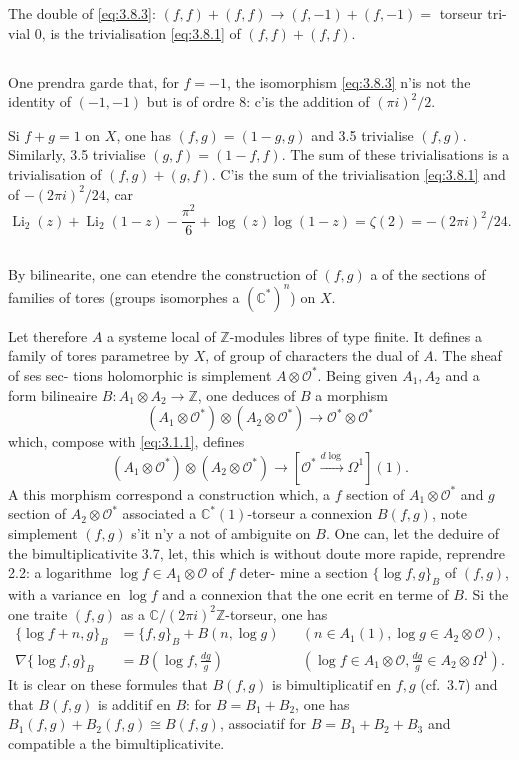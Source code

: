 \documentclass[12pt,a4paper]{article}
\theoremstyle{plain}
\theoremstyle{definition}
\theoremstyle{remark}
\newcommand{\cO}{\mathcal{O}}
\newcommand{\Z}{\mathbb{Z}}
\newcommand{\C}{\mathbb{C}}
\providecommand{\cO}{\mathcal{O}}
\begin{document}
The double of \eqref{eq:3.8.3}: $(f,f) + (f,f) \to (f,-1) + (f,-1) = {}$ torseur tri-
vial $0$, is the trivialisation \eqref{eq:3.8.1} of $(f,f) + (f,f)$.

\subsection{}

One prendra garde that, for $f = -1$, the isomorphism \eqref{eq:3.8.3} n'is not
the identity of $(-1, -1)$ but is of ordre $8$: c'is the addition of $(\pi i)^2/2$.

Si $f + g = 1$ on $X$, one has $(f,g) = (1-g, g)$ and 3.5 trivialise $(f,g)$. Similarly,
3.5 trivialise $(g,f) = (1-f, f)$. The sum of these trivialisations is a trivialisation
of $(f,g) + (g,f)$. C'is the sum of the trivialisation \eqref{eq:3.8.1} and of $-(2\pi i)^2/24$, car
\[
\operatorname{Li}_2(z) + \operatorname{Li}_2(1-z) - \frac{\pi^2}{6} + \log(z) \log(1-z) = \zeta(2) = -(2\pi i)^2/24.
\]

\subsection{}

By bilinearite, one can etendre the construction of $(f,g)$ a of the sections of
families of tores (groups isomorphes a $(\C^*)^n$) on $X$.

Let therefore $A$ a systeme local of $\Z$-modules libres of type finite. It defines a family
of tores parametree by $X$, of group of characters the dual of $A$. The sheaf of ses sec-
tions holomorphic is simplement $A \otimes \cO^*$. Being given $A_1, A_2$ and a form bilineaire
$B : A_1 \otimes A_2 \to \Z$, one deduces of $B$ a morphism
\[
(A_1 \otimes \cO^*) \otimes (A_2 \otimes \cO^*) \to \cO^* \otimes \cO^*
\]
which, compose with \eqref{eq:3.1.1}, defines
\[
(A_1 \otimes \cO^*) \otimes (A_2 \otimes \cO^*) \to [\cO^* \xrightarrow{d\log} \Omega^1](1).
\]
A this morphism correspond a construction which, a $f$ section of $A_1 \otimes \cO^*$ and $g$ section
of $A_2 \otimes \cO^*$ associated a $\C^*(1)$-torseur a connexion $B(f,g)$, note simplement $(f,g)$ s'it
n'y a not of ambiguite on $B$. One can, let the deduire of the bimultiplicativite 3.7, let,
this which is without doute more rapide, reprendre 2.2: a logarithme $\log f \in A_1 \otimes \cO$ of $f$ deter-
mine a section $\{\log f, g\}_B$ of $(f,g)$, with a variance en $\log f$ and a connexion that
the one ecrit en terme of $B$. Si the one traite $(f,g)$ as a $\C/(2\pi i)^2\Z$-torseur, one has
\begin{align}
\{\log f + n, g\}_B &= \{f,g\}_B + B(n, \log g) && (n \in A_1(1), \log g \in A_2 \otimes \cO), \label{eq:3.10.1} \\
\nabla\{\log f, g\}_B &= B(\log f, \frac{dg}{g}) && (\log f \in A_1 \otimes \cO, \frac{dg}{g} \in A_2 \otimes \Omega^1). \label{eq:3.10.2}
\end{align}
It is clear on these formules that $B(f,g)$ is bimultiplicatif en $f, g$ (cf.~3.7) and that
$B(f,g)$ is additif en $B$: for $B = B_1 + B_2$, one has $B_1(f,g) + B_2(f,g) \cong B(f,g)$, associatif
for $B = B_1 + B_2 + B_3$ and compatible a the bimultiplicativite.
\end{document}
